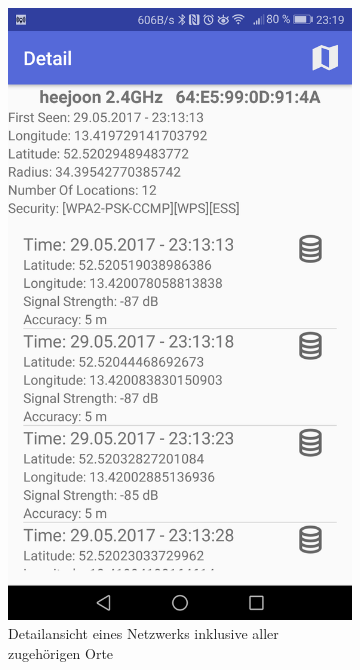 \documentclass[11pt,a4paper]{article}
\begin{document}
\begin{figure}[htbp]
    \begin{subfigure}[htbp]{0.26\textwidth}
        \includegraphics[width=\textwidth]{pics/screenshots/AirSniffer_Detail_List.png}
        \caption{Detailansicht eines Netzwerks inklusive aller zugehörigen Orte}
        \label{fig:AirSniffer_Detail_List}
    \end{subfigure}
    \begin{subfigure}[htbp]{0.26\textwidth}

\end{subfigure}
\end{figure}
\end{document}
